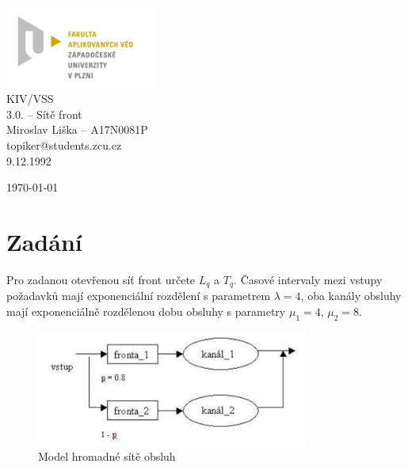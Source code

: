 \documentclass{article}
\begin{document}


\begin{titlepage}	
	\begin{center}
		\includegraphics[width=5cm]{logo.jpg}\\[3.5cm]
		{\Huge KIV/VSS}\\[0.5cm]
		{\Large 3.0. – Sítě front}\\[0.5cm]
		{\large  Miroslav Liška – A17N0081P}\\[0.5cm]
		{\large  topiker@students.zcu.cz}\\[0.5cm]
		{\large   9.12.1992}\\[0.5cm]
		\vfill

		{\large \today}

	\end{center}
\end{titlepage}



\section{Zadání} %
\setcounter{page}{1}
Pro zadanou otevřenou síť front určete \(L_q\) a \(T_q\). 
Časové intervaly mezi vstupy požadavků mají exponenciální rozdělení s parametrem \( \lambda = 4 \), oba kanály obsluhy mají exponenciálně rozdělenou dobu obsluhy s parametry \( \mu_1 = 4 \), \( \mu_2 = 8 \).

\begin{figure}[ht]
  \centering
    \includegraphics[width=0.8\textwidth]{sho.png}
  \caption{Model hromadné sítě obsluh}
  \label{fig:gull}
\end{figure}
 
\end{document}
